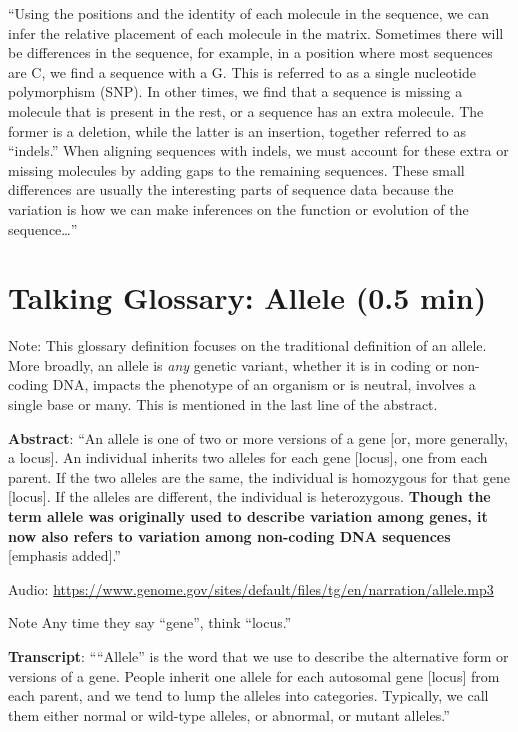 \documentclass[
]{book}
\begin{document}
``Using the positions and the identity of each molecule in the sequence, we can infer the relative placement of each molecule in the matrix. Sometimes there will be differences in the sequence, for example, in a position where most sequences are C, we find a sequence with a G. This is referred to as a single nucleotide polymorphism (SNP). In other times, we find that a sequence is missing a molecule that is present in the rest, or a sequence has an extra molecule. The former is a deletion, while the latter is an insertion, together referred to as ``indels.'' When aligning sequences with indels, we must account for these extra or missing molecules by adding gaps to the remaining sequences. These small differences are usually the interesting parts of sequence data because the variation is how we can make inferences on the function or evolution of the sequence\ldots''

\hypertarget{talking-glossary-allele-0.5-min}{%
\section{Talking Glossary: Allele (0.5 min)}\label{talking-glossary-allele-0.5-min}}

Note: This glossary definition focuses on the traditional definition of an allele. More broadly, an allele is \emph{any} genetic variant, whether it is in coding or non-coding DNA, impacts the phenotype of an organism or is neutral, involves a single base or many. This is mentioned in the last line of the abstract.

\textbf{Abstract}: ``An allele is one of two or more versions of a gene {[}or, more generally, a locus{]}. An individual inherits two alleles for each gene {[}locus{]}, one from each parent. If the two alleles are the same, the individual is homozygous for that gene {[}locus{]}. If the alleles are different, the individual is heterozygous. \textbf{Though the term allele was originally used to describe variation among genes, it now also refers to variation among non-coding DNA sequences} {[}emphasis added{]}.''

Audio: \url{https://www.genome.gov/sites/default/files/tg/en/narration/allele.mp3}

Note Any time they say ``gene'', think ``locus.''

\textbf{Transcript}: ````Allele'' is the word that we use to describe the alternative form or versions of a gene. People inherit one allele for each autosomal gene {[}locus{]} from each parent, and we tend to lump the alleles into categories. Typically, we call them either normal or wild-type alleles, or abnormal, or mutant alleles.''
\end{document}
